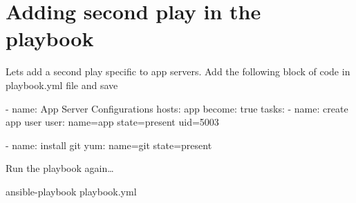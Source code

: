 \section{Adding second play in the playbook}

Lets add a second play specific to app servers. Add the following block of code in playbook.yml file and save

\begin{code}
- name: App Server Configurations
  hosts: app
  become: true
  tasks:
    - name: create app user
      user: name=app state=present uid=5003

    - name: install git
      yum:  name=git  state=present
\end{code}

Run the playbook again\ldots{}

\begin{code}
ansible-playbook playbook.yml
\end{code}

